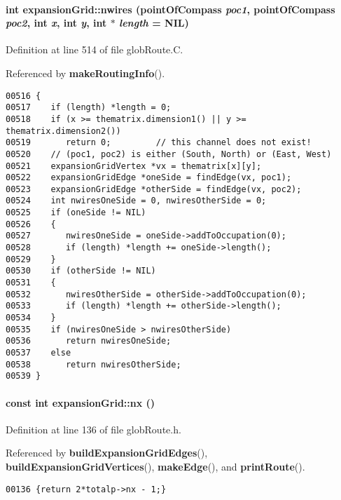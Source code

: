 \paragraph{\setlength{\rightskip}{0pt plus 5cm}int expansion\-Grid::nwires ({\bf point\-Of\-Compass} {\em poc1}, {\bf point\-Of\-Compass} {\em poc2}, int {\em x}, int {\em y}, int $\ast$ {\em length} = NIL)}\hfill



Definition at line 514 of file glob\-Route.C.

Referenced by {\bf make\-Routing\-Info}().\small\begin{verbatim}00516 {
00517    if (length) *length = 0;
00518    if (x >= thematrix.dimension1() || y >= thematrix.dimension2())
00519       return 0;         // this channel does not exist!
00520    // (poc1, poc2) is either (South, North) or (East, West)
00521    expansionGridVertex *vx = thematrix[x][y];
00522    expansionGridEdge *oneSide = findEdge(vx, poc1);
00523    expansionGridEdge *otherSide = findEdge(vx, poc2);
00524    int nwiresOneSide = 0, nwiresOtherSide = 0;
00525    if (oneSide != NIL)
00526    {
00527       nwiresOneSide = oneSide->addToOccupation(0);
00528       if (length) *length += oneSide->length();
00529    }
00530    if (otherSide != NIL)
00531    {
00532       nwiresOtherSide = otherSide->addToOccupation(0);
00533       if (length) *length += otherSide->length();
00534    }
00535    if (nwiresOneSide > nwiresOtherSide)
00536       return nwiresOneSide;
00537    else
00538       return nwiresOtherSide;
00539 }
\end{verbatim}\normalsize 
\label{expansionGrid_a1}
\paragraph{\setlength{\rightskip}{0pt plus 5cm}const int expansion\-Grid::nx ()\hspace{0.3cm}{\tt  [inline]}}\hfill



Definition at line 136 of file glob\-Route.h.

Referenced by {\bf build\-Expansion\-Grid\-Edges}(), {\bf build\-Expansion\-Grid\-Vertices}(), {\bf make\-Edge}(), and {\bf print\-Route}().\small\begin{verbatim}00136 {return 2*totalp->nx - 1;}
\end{verbatim}\normalsize 
\label{expansionGrid_a2}
